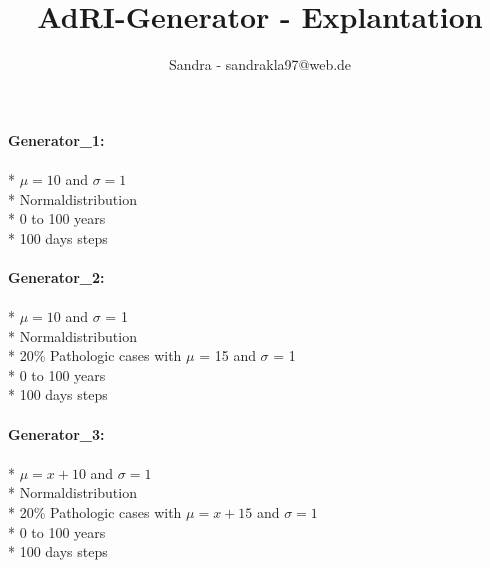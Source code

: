 \documentclass{article}
\title{AdRI-Generator - Explantation}
\author{Sandra - sandrakla97@web.de}
\begin{document}
\maketitle

\textbf{Generator\_1:} \\ \\
* $\mu = 10$ and $\sigma = 1$ \\
* Normaldistribution \\
* 0 to 100 years \\
* 100 days steps \\ \\

\textbf{Generator\_2:} \\ \\
* $\mu = 10$ and $\sigma$ = 1 \\
* Normaldistribution \\
* 20\% Pathologic cases with $\mu$ = 15 and $\sigma$ = 1 \\
* 0 to 100 years \\
* 100 days steps \\ \\

\textbf{Generator\_3:} \\ \\
* $\mu = x+10$ and $\sigma = 1$ \\
* Normaldistribution \\
* 20\% Pathologic cases with $\mu = x+15$ and $\sigma = 1$ \\
* 0 to 100 years \\
* 100 days steps \\ \\
\end{document}
